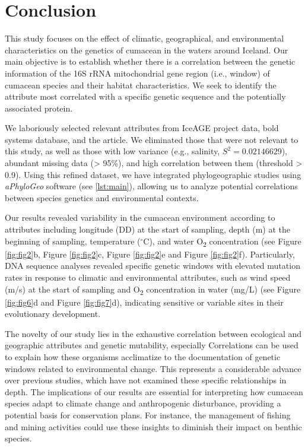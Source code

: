 \section{Conclusion}\label{conclusion}
This study focuses on the effect of climatic, geographical, and environmental characteristics on the genetics of cumacean in the waters around Iceland. Our main objective is to establish whether there is a  correlation between the genetic information of the 16S rRNA mitochondrial gene region (i.e., window) of cumacean species and their habitat characteristics. We seek to identify the attribute most correlated with a specific genetic sequence and the potentially associated protein.

We laboriously selected relevant attributes from IceAGE project data, bold systems database, and the \citep{uhlir_adding_2021} article. We eliminated those that were not relevant to this study, as well as those with low variance (e.g., salinity, $S^2 = 0.02146629$), abundant missing data (> 95\%), and high correlation between them (threshold > 0.9). Using this refined dataset, we have integrated phylogeographic studies using \textit{aPhyloGeo} software (see \autoref{lst:main}), allowing us to analyze potential correlations between species genetics and environmental contexts.

Our results revealed variability in the cumacean environment according to attributes including longitude (DD) at the start of sampling, depth (m) at the beginning of sampling, temperature ($^\circ$C), and water O\textsubscript{2} concentration (see Figure \ref{fig:fig2}b, Figure \ref{fig:fig2}c, Figure \ref{fig:fig2}e and Figure \ref{fig:fig2}f). Particularly, DNA sequence analyses revealed specific genetic windows with elevated mutation rates in response to climatic and environmental attributes, such as wind speed (m/s) at the start of sampling and O\textsubscript{2} concentration in water (mg/L) (see Figure \ref{fig:fig6}d and Figure \ref{fig:fig7}d), indicating sensitive or variable sites in their evolutionary development.

The novelty of our study lies in the exhaustive correlation between ecological and geographic attributes and genetic mutability, especially  
Correlations can be used to explain how these organisms acclimatize to the documentation of genetic windows related to environmental change. This represents a considerable advance over previous studies, which have not examined these specific relationships in depth. The implications of our results are essential for interpreting how cumacean species adapt to climate change and anthropogenic disturbance, providing a potential basis for conservation plans. For instance, the management of fishing and mining activities could use these insights to diminish their impact on benthic species.


